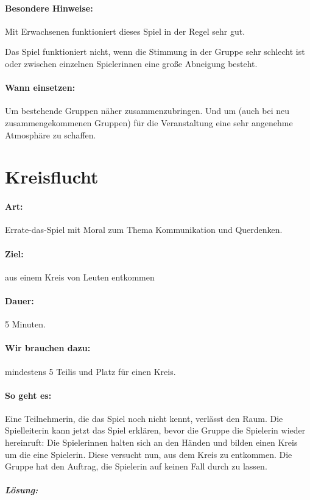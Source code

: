 \paragraph{Besondere Hinweise:} Mit Erwachsenen funktioniert dieses Spiel in der Regel sehr gut.

Das Spiel funktioniert nicht, wenn die Stimmung in der Gruppe sehr schlecht ist oder zwischen einzelnen Spielerinnen eine große Abneigung besteht.
\paragraph{Wann einsetzen:} Um bestehende Gruppen näher zusammenzubringen. Und um (auch bei neu zusammengekommenen Gruppen) für die Veranstaltung eine sehr angenehme Atmosphäre zu schaffen.

\section{Kreisflucht}
\paragraph{Art:} Errate-das-Spiel mit Moral zum Thema Kommunikation und Querdenken.
\paragraph{Ziel:} aus einem Kreis von Leuten entkommen
\paragraph{Dauer:} 5 Minuten.
\paragraph{Wir brauchen dazu:} mindestens 5 Teilis und Platz für einen Kreis.
\paragraph{So geht es:} Eine Teilnehmerin, die das Spiel noch nicht kennt, verlässt den Raum. Die Spielleiterin kann jetzt das Spiel erklären, bevor die Gruppe die Spielerin wieder hereinruft: Die Spielerinnen halten sich an den Händen und bilden einen Kreis um die eine Spielerin. Diese versucht nun, aus dem Kreis zu entkommen. Die Gruppe hat den Auftrag, die Spielerin auf keinen Fall durch zu lassen.

\subparagraph{Lösung:}


